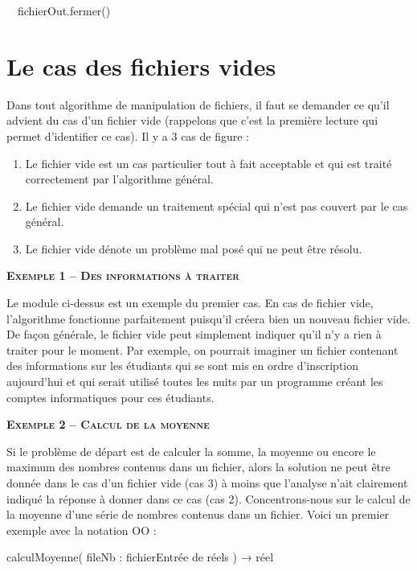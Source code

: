 {\sffamily
\ \ fichierOut.fermer() }

{\sffamily
{}}

\section{Le cas des fichiers vides}
{
Dans tout algorithme de manipulation de fichiers, il faut se demander ce
qu'il advient du cas d'un fichier
vide (rappelons que c'est la première lecture qui
permet d'identifier ce cas). Il y a 3 cas de figure :}

\liststyleNumberingii
\begin{enumerate}
\item {
Le fichier vide est un cas particulier tout à fait acceptable et qui est
traité correctement par l'algorithme général.}
\item {
Le fichier vide demande un traitement spécial qui n'est
pas couvert par le cas général.}
\item {
Le fichier vide dénote un problème mal posé qui ne peut être résolu.}
\end{enumerate}
{\sffamily\bfseries\scshape
Exemple 1 – Des informations à traiter}

{
Le module  ci-dessus est un exemple du
premier cas. En cas de fichier vide, l'algorithme
fonctionne parfaitement puisqu'il créera bien un
nouveau fichier vide. De façon générale, le fichier vide peut
simplement indiquer qu'il n'y a rien
à traiter pour le moment. Par exemple, on pourrait imaginer un fichier
contenant des informations sur les étudiants qui se sont mis en ordre
d'inscription aujourd'hui et qui
serait utilisé toutes les nuits par un programme créant les comptes
informatiques pour ces étudiants. \ }

{\sffamily\bfseries\scshape
Exemple 2 – Calcul de la moyenne}

{
Si le problème de départ est de calculer la somme, la moyenne ou encore
le maximum des nombres contenus dans un fichier, alors la solution ne
peut être donnée dans le cas d'un fichier vide (cas 3)
à moins que l'analyse n'ait
clairement indiqué la réponse à donner dans ce cas (cas 2).
Concentrons-nous sur le calcul de la moyenne d’une série de nombres
contenus dans un fichier. Voici un premier exemple avec la notation OO
:}

{\sffamily
{} calculMoyenne( fileNb : fichierEntrée de réels )
{→} réel}


\bigskip

